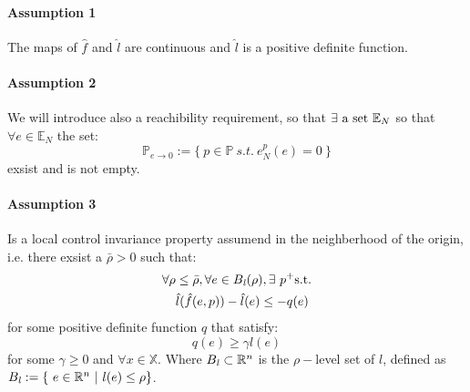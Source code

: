 \paragraph{Assumption 1} The maps of $\hat{f}$ and $\hat{l}$ are continuous and $\hat{l}$ is a positive definite function. 

\paragraph{Assumption 2} We will introduce also a reachibility requirement, so that $\exists \textnormal{ a set } \mathbb{E}_N$ so that $\forall e \in \mathbb{E}_N $ the set:
\begin{equation*}
	\mathbb{P}_{e \to 0}:=\lbrace \ p \in \mathbb{P}\ s.t.\ e_N^p(e)=0\ \rbrace
\end{equation*} exsist and is not empty.

\paragraph{Assumption 3} Is a local control invariance property assumend in the neighberhood of the origin, i.e. there exsist a $\bar{\rho} > 0$ such that:
\begin{equation}
	\begin{split}
		\forall \rho &\leq \bar{\rho}, \forall e \in B_{\it{l}}(\rho),\exists\ p^+\textnormal{s.t.} \\
		&\hat{l}(\hat{f}(e,p))-\hat{l}(e) \leq -q(e) \\
		\label{ass3}
	\end{split}
\end{equation}
for some positive definite function $q$ that satisfy:
\begin{equation}
	q(e) \ge \gamma l(e)
	\label{ass3} 
\end{equation}
for some $\gamma \geq 0$ and $\forall x \in \mathbb{X}$.
Where $B_{\it{l}} \subset \mathbb{R}^n$ is the $\rho-$level set of $l$, defined as $B_{\it{l}} := \lbrace\ e \in \mathbb{R}^n\ |\ l(e) \leq \rho \rbrace$.

